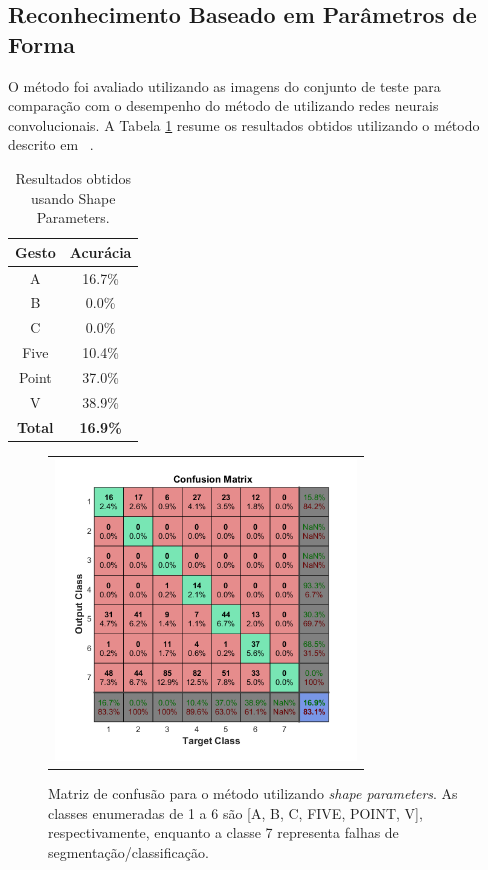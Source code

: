 \documentclass[conference]{IEEEtran}
\begin{document}
\subsection{Reconhecimento Baseado em Parâmetros de Forma}
O método foi avaliado utilizando as imagens do conjunto de teste para comparação com o desempenho do método de utilizando redes neurais convolucionais. A Tabela \ref{tab:res2} resume os resultados obtidos utilizando o método descrito em ~\cite{shapeparameters}.

\begin{table}[htbp]
\centering
\caption{Resultados obtidos usando Shape Parameters.}
\label{tab:res2}
\begin{tabular}{|c|c|}
\hline
Gesto & Acurácia    \\\hline
A       & 16.7\%   \\\hline
B       & 0.0\%    \\\hline
C       & 0.0\%    \\\hline
Five    & 10.4\%   \\\hline
Point   & 37.0\%   \\\hline
V       & 38.9\%   \\\hline
\textbf{Total} & \textbf{16.9\%} \\\hline
\end{tabular}
\end{table}

\begin{figure}[htbp]

\begin{tabular}{c}
	\includegraphics[width=8cm]{figs/confusion_matrix.png} 
\end{tabular}
\caption{Matriz de confusão para o método utilizando \textit{shape parameters}. As classes enumeradas de 1 a 6 são [A, B, C, FIVE, POINT, V], respectivamente, enquanto a classe 7 representa falhas de segmentação/classificação.}
\label{fig:res2}
\end{figure}
\end{document}
